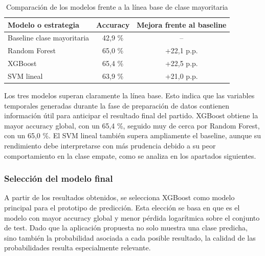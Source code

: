 \begin{table}[H]
    \centering
    \begin{tabular}{lcc}
        \hline
        \textbf{Modelo o estrategia} & \textbf{Accuracy} & \textbf{Mejora frente al baseline} \\
        \hline
        Baseline clase mayoritaria   & 42,9 \%           & --                                 \\
        Random Forest                & 65,0 \%           & +22,1 p.p.                         \\
        XGBoost                      & 65,4 \%           & +22,5 p.p.                         \\
        SVM lineal                   & 63,9 \%           & +21,0 p.p.                         \\
        \hline
    \end{tabular}
    \caption{Comparación de los modelos frente a la línea base de clase mayoritaria}
    \label{tab:comparacion_baseline}
\end{table}

Los tres modelos superan claramente la línea base. Esto indica que las variables temporales generadas durante la fase de preparación de datos contienen información útil para anticipar el resultado final del partido. XGBoost obtiene la mayor accuracy global, con un 65,4 \%, seguido muy de cerca por Random Forest, con un 65,0 \%. El SVM lineal también supera ampliamente el baseline, aunque su rendimiento debe interpretarse con más prudencia debido a su peor comportamiento en la clase empate, como se analiza en los apartados siguientes.

\subsubsection*{Selección del modelo final}

A partir de los resultados obtenidos, se selecciona XGBoost como modelo principal para el prototipo de predicción. Esta elección se basa en que es el modelo con mayor accuracy global y menor pérdida logarítmica sobre el conjunto de test. Dado que la aplicación propuesta no solo muestra una clase predicha, sino también la probabilidad asociada a cada posible resultado, la calidad de las probabilidades resulta especialmente relevante.

